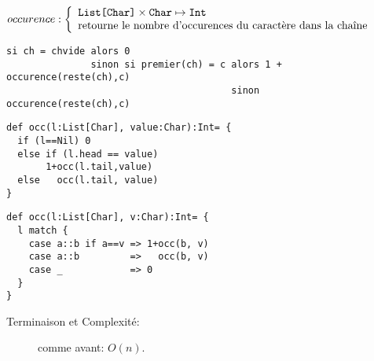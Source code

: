 \documentclass[10pt]{article}\usepackage[correction,nu]{esial}
\begin{document}
\begin{Question}
  $occurence: \left\{
    \begin{array}{l}
      \text{\texttt{List[Char]}}\times \text{\texttt{Char}}\mapsto \text{\texttt{Int}}\\
      \text{retourne le nombre d'occurences du caractère dans la chaîne}
    \end{array}\right.$  
\end{Question}
\begin{Reponse}
  \begin{Verbatim}[label=occurences(ch\quotesinglbase c)]
si ch = chvide alors 0
               sinon si premier(ch) = c alors 1 + occurence(reste(ch),c)
                                        sinon     occurence(reste(ch),c)    
  \end{Verbatim}

\noindent
  \begin{minipage}{.49\linewidth}
  \begin{Verbatim}
def occ(l:List[Char], value:Char):Int= {
  if (l==Nil) 0
  else if (l.head == value) 
       1+occ(l.tail,value)
  else   occ(l.tail, value)
}

  \end{Verbatim}    
  \end{minipage}
  \begin{minipage}{.49\linewidth}
  \begin{Verbatim}[numbers=right]
def occ(l:List[Char], v:Char):Int= {
  l match {
    case a::b if a==v => 1+occ(b, v)
    case a::b         =>   occ(b, v)
    case _            => 0
  }
}
  \end{Verbatim}        
  \end{minipage}
  \begin{description}
  \item[Terminaison et Complexité:] comme avant: $O(n)$. 
  \end{description}
\end{Reponse}
\end{document}
